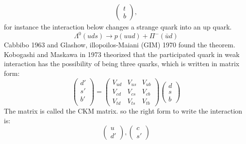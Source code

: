 \documentclass[10pt,a4paper]{article}
\newcounter{theo}
\begin{document}
\begin{itemize}
\begin{align*}
                    \begin{pmatrix}
                         t \\ b
                    \end{pmatrix} ,
               \end{align*}
               for instance the interaction below changes a strange quark into an up quark.
               \begin{equation}
                    \Lambda^0 (uds)\rightarrow p(uud) + \Pi^-(\bar u d)
               \end{equation}
                    Cabbibo 1963 and Glashow, illopoilos-Maiani (GIM) 1970 found the theorem. Kobogashi and Maskawa in 1973 theorized that the participated quark in weak interaction has the possibility of being three quarks, which is written in matrix form:
               \begin{equation}
                    \begin{pmatrix}
                         d'\\
                         s'\\
                         b'\\
                    \end{pmatrix}
                    =\begin{pmatrix}
                         V_{ud} & V_{us} & V_{ub}\\
                         V_{cd} & V_{cs} & V_{cb}\\
                         V_{td} & V_{ts} & V_{tb}
                    \end{pmatrix}
                    \begin{pmatrix}
                         d\\ s\\ b
                    \end{pmatrix}
               \end{equation}
               The matrix is called the CKM matrix. so the right form to write the interaction is:
               \begin{equation}
                    \begin{pmatrix}
                         u\\
                         d'
                    \end{pmatrix},
                    \begin{pmatrix}
                         c\\
                         s'

\end{pmatrix}
\end{equation}
\end{itemize}
\end{document}
